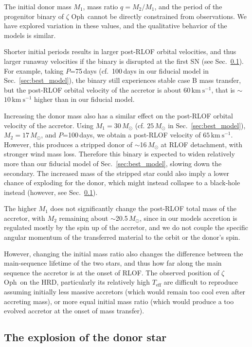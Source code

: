 \documentclass[twocolumn,twocolappendix,trackchanges]{aastex63}
\newcommand{\kms}{{\mathrm{km\ s^{-1}}}}
\DeclareRobustCommand{\Secref}[1]{Sec.~\ref{#1}}
\newcommand{\zoph}{$\zeta$ Oph}
\begin{document}
The initial donor mass $M_1$, mass ratio $q=M_2/M_1$, and the period of the progenitor binary of \zoph\ cannot be directly
constrained from observations. We have explored variation in these values, and the
qualitative behavior of the models is similar.

Shorter initial periods results in larger post-RLOF orbital
velocities, and thus larger runaway velocities if the binary is
disrupted at the first SN (see \Secref{sec:SN_comp}). For example, taking $P$=75\,days
(cf.~100\,days in our fiducial model in \Secref{sec:best_model}), the
binary still experiences stable case B mass transfer, but the
post-RLOF orbital velocity of the accretor is about $60\,\kms$, that
is $\sim$$10\,\kms$ higher
than in our fiducial model.

Increasing the donor mass also has a similar effect on the post-RLOF orbital velocity of the accretor. Using
$M_1=30\,M_\odot$ (cf.
$25\,M_\odot$ in \Secref{sec:best_model}),
$M_2=17\,M_\odot$, and
$P$=100\,days, we obtain a post-RLOF velocity of
$65\,\kms$. However, this produces a stripped donor of
$\sim$16\,$M_\odot$ at RLOF detachment, with stronger wind mass loss. Therefore this binary is expected to widen relatively more than our fiducial model of \Secref{sec:best_model}, slowing down the secondary. The increased mass of the stripped star could also imply a lower chance of exploding for the donor, which might instead collapse to a black-hole instead (however, see \Secref{sec:SN_comp}).

The higher $M_1$ does not significantly change the post-RLOF total
mass of the accretor, with $M_2$ remaining about $\sim$20.5\,$M_\odot$, since
in our models accretion is regulated mostly by the spin up of the
accretor, and we do not couple the specific angular momentum of the transferred
material to the orbit or the donor's spin.

However, changing the initial mass ratio also changes the difference
between the main-sequence lifetime of the two stars, and thus how far
along the main sequence the accretor is at the onset of RLOF. The observed
position of \zoph\ on the HRD, particularly its relatively high
$T_\mathrm{eff}$ are difficult to reproduce assuming initially less
massive accretors (which would remain too cool even after accreting
mass), or more equal initial mass ratio (which would produce a too
evolved accretor at the onset of mass transfer).

\subsection{The explosion of the donor star}
\label{sec:SN_comp}
\end{document}
